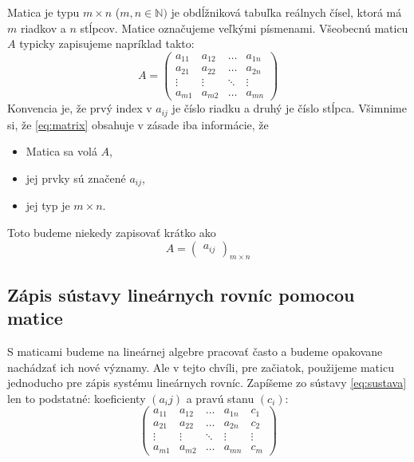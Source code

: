 \documentclass{article}
\begin{document}
Matica je typu $m\times n$ ($m,n\in\mathbb N)$ je obdĺžniková tabuľka reálnych čísel,
ktorá má $m$ riadkov a $n$ stĺpcov. Matice označujeme veľkými písmenami.
Všeobecnú maticu $A$ typicky zapisujeme napríklad takto:
\begin{equation}\label{eq:matrix}
A=
\left(
\begin{array}{cccc}
    a_{11} & a_{12} & \dots & a_{1n} \\
    a_{21} & a_{22} & \dots & a_{2n} \\
    \vdots & \vdots & \ddots & \vdots \\
    a_{m1} & a_{m2} & \dots & a_{mn}
\end{array}
\right)
\end{equation}
Konvencia je, že prvý index v $a_{ij}$ je číslo riadku a  
druhý je číslo stĺpca. Všimnime si, že \eqref{eq:matrix} obsahuje v zásade iba
informácie, že
\begin{itemize}
\item Matica sa volá $A$,
\item jej prvky sú značené $a_{ij}$,
\item jej typ je $m\times n$.
\end{itemize}
Toto budeme niekedy zapisovať krátko ako
\[
A=
\left(
\begin{array}{c}
a_{ij}
\end{array}
\right)_{m\times n}
\]


\subsection{Zápis sústavy lineárnych rovníc pomocou matice}

S maticami budeme na lineárnej algebre
pracovať často a budeme opakovane nachádzať ich nové významy. 
Ale v tejto chvíli, pre začiatok, použijeme maticu jednoducho pre zápis systému
lineárnych rovníc. Zapíšeme zo sústavy \eqref{eq:sustava} len to podstatné: koeficienty $(a_ij)$ a
pravú stanu $(c_i)$:
\[
\left( \begin{array}{cccc|c} a_{11} & a_{12} & \dots & a_{1n} & c_{1} \\ a_{21} & a_{22} & \dots & a_{2n} & c_{2} \\ \vdots & \vdots & \ddots & \vdots & \vdots \\ a_{m1} & a_{m2} & \dots & a_{mn} & c_{m} \end{array} \right)
\]
\end{document}
